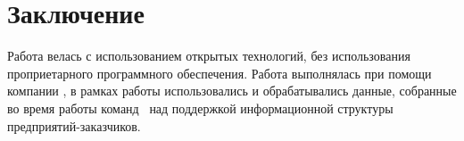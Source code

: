 \chapter*{Заключение}						%




Работа велась с использованием открытых технологий, без использования проприетарного программного обеспечения.  
Работа выполнялась при помощи компании \icl, в рамках работы использовались и обрабатывались данные, собранные во время работы команд \icl\  над поддержкой информационной структуры предприятий-заказчиков.